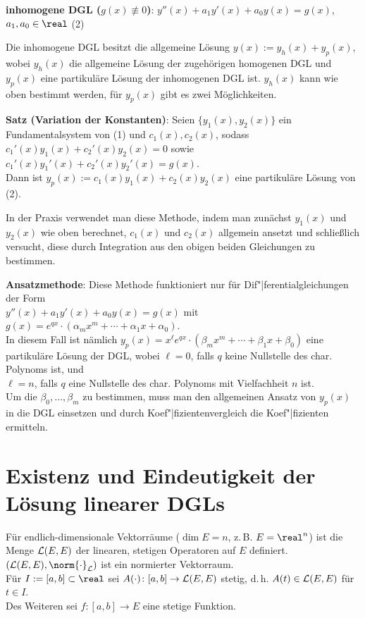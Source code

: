 \linie

\textbf{inhomogene DGL ($g(x) \not\equiv 0$)}:
$y''(x) + a_1 y'(x) + a_0 y(x) = g(x)$, $a_1, a_0 \in \real$ \qquad (2)

Die inhomogene DGL besitzt die allgemeine Lösung
$y(x) := y_h(x) + y_p(x)$, wobei $y_h(x)$ die allgemeine Lösung der zugehörigen
homogenen DGL und $y_p(x)$ eine partikuläre Lösung der inhomogenen DGL ist.
$y_h(x)$ kann wie oben bestimmt werden, für $y_p(x)$ gibt es zwei
Möglichkeiten.

\textbf{Satz (Variation der Konstanten)}:
Seien $\{y_1(x), y_2(x)\}$ ein Fundamentalsystem von (1) und $c_1(x), c_2(x)$,
sodass $c_1'(x) y_1(x) + c_2'(x) y_2(x) = 0$ sowie
$c_1'(x) y_1'(x) + c_2'(x) y_2'(x) = g(x)$. \\
Dann ist $y_p(x) := c_1(x) y_1(x) + c_2(x) y_2(x)$ eine partikuläre
Lösung von (2).

In der Praxis verwendet man diese Methode, indem man zunächst $y_1(x)$ und
$y_2(x)$ wie oben berechnet, $c_1(x)$ und $c_2(x)$ allgemein ansetzt und
schließlich versucht, diese durch Integration aus den obigen beiden Gleichungen
zu bestimmen.

\textbf{Ansatzmethode}:
Diese Methode funktioniert nur für Dif"|ferentialgleichungen der Form \\
$y''(x) + a_1 y'(x) + a_0 y(x) = g(x)$
mit $g(x) = e^{qx} \cdot (\alpha_m x^m + \dotsb + \alpha_1 x + \alpha_0)$. \\
In diesem Fall ist nämlich
$y_p(x) = x^\ell e^{qx} \cdot (\beta_m x^m + \dotsb + \beta_1 x + \beta_0)$
eine partikuläre Lösung der DGL, wobei
$\ell = 0$, falls $q$ keine Nullstelle des char. Polynoms ist, und \\
$\ell = n$, falls $q$ eine Nullstelle des char. Polynoms mit
Vielfachheit $n$ ist. \\
Um die $\beta_0, \dotsc, \beta_m$ zu bestimmen, muss man
den allgemeinen Ansatz von $y_p(x)$ in die DGL einsetzen und durch
Koef"|fizientenvergleich die Koef"|fizienten ermitteln.

\pagebreak

\section{%
    Existenz und Eindeutigkeit der Lösung linearer DGLs%
}

Für endlich-dimensionale Vektorräume ($\dim E = n$, z.\,B. $E = \real^n$)
ist die Menge $\mathcal{L}(E, E)$ der linearen, stetigen Operatoren auf $E$ definiert.
$(\L(E, E), \norm{\cdot}_\L)$ ist ein normierter Vektorraum. \\
Für $I := [a, b] \subset \real$ sei $A(\cdot)\colon [a, b] \rightarrow \mathcal{L}(E, E)$
stetig, d.\,h. $A(t) \in \mathcal{L}(E, E)$ für $t \in I$. \\
Des Weiteren sei $f\colon [a, b] \rightarrow E$ eine stetige Funktion.

